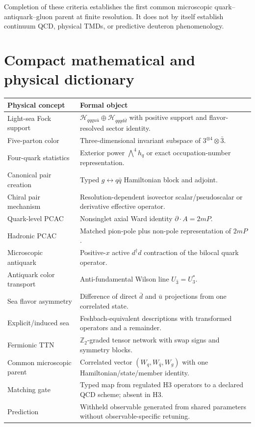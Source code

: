\documentclass[11pt]{article}
\newcommand{\Hil}{\mathcal H}
\newcommand{\Hfiveu}{\Hil_{qqqu\bar u}}
\newcommand{\Hfived}{\Hil_{qqqd\bar d}}
\begin{document}
Completion of these criteria establishes the first common microscopic
quark--antiquark--gluon parent at finite resolution.  It does not by itself
establish continuum QCD, physical TMDs, or predictive deuteron phenomenology.

\appendix

\section{Compact mathematical and physical dictionary}

\begin{longtable}{L{0.30\textwidth}L{0.62\textwidth}}
\toprule
Physical concept & Formal object\\
\midrule
\endhead
Light-sea Fock support & \(\Hfiveu\oplus\Hfived\) with positive support and
flavor-resolved sector identity.\\
Five-parton color & Three-dimensional invariant subspace of
\(3^{\otimes4}\otimes\bar3\).\\
Four-quark statistics & Exterior power \(\bigwedge^4 h_q\) or exact
occupation-number representation.\\
Canonical pair creation & Typed \(g\leftrightarrow q\bar q\) Hamiltonian
block and adjoint.\\
Chiral pair mechanism & Resolution-dependent isovector scalar/pseudoscalar or
derivative effective operator.\\
Quark-level PCAC & Nonsinglet axial Ward identity
\(\partial\cdot A=2mP\).\\
Hadronic PCAC & Matched pion-pole plus non-pole representation of \(2mP\).\\
Microscopic antiquark & Positive-\(x\) active \(d^{\dagger}d\) contraction of
the bilocal quark operator.\\
Antiquark color transport & Anti-fundamental Wilson line
\(U_{\bar3}=U_3^*\).\\
Sea flavor asymmetry & Difference of direct \(\bar d\) and \(\bar u\)
projections from one correlated state.\\
Explicit/induced sea & Feshbach-equivalent descriptions with transformed
operators and a remainder.\\
Fermionic TTN & \(\mathbb Z_2\)-graded tensor network with swap signs and
symmetry blocks.\\
Common microscopic parent & Correlated vector \((W_q,W_{\bar q},W_g)\) with
one Hamiltonian/state/member identity.\\
Matching gate & Typed map from regulated H3 operators to a declared QCD
scheme; absent in H3.\\
Prediction & Withheld observable generated from shared parameters without
observable-specific retuning.\\
\bottomrule
\end{longtable}
\end{document}
